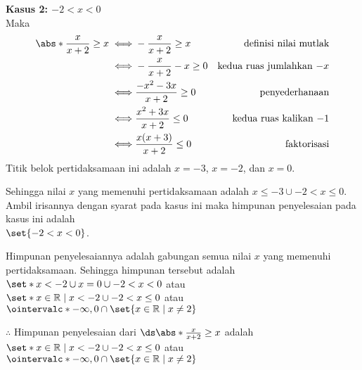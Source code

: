 \begin{enumerate}[leftmargin=*, label={\arabic*}.]
\begin{enumerate}[label={\alph*}.]
\textbf{Kasus 2: $-2 < x < 0$}\\
Maka
\begin{align*}
    \abs*{\frac{x}{x+2}} \geq x
    \iff &-\frac{x}{x+2} \geq x
    &\text{definisi nilai mutlak} \\
    \iff &-\frac{x}{x+2} -x \geq 0
    &\text{kedua ruas jumlahkan $-x$}\\
    \iff &\frac{-x^{2}-3x}{x+2} \geq 0
    &\text{penyederhanaan}\\
    \iff &\frac{x^{2}+3x}{x+2} \leq 0
    &\text{kedua ruas kalikan $-1$}\\
    \iff &\frac{x(x+3)}{x+2} \leq 0
    &\text{faktorisasi}\\
\end{align*}
Titik belok pertidaksamaan ini adalah $x=-3$, $x=-2$, dan $x=0$.
\begin{center}
\end{center}
Sehingga nilai $x$ yang memenuhi pertidaksamaan adalah $x \leq -3 \cup -2 < x \leq 0$. Ambil 
irisannya dengan syarat pada kasus ini maka himpunan penyelesaian pada kasus ini adalah 
\\$\set{-2 < x < 0}$. 

Himpunan penyelesaiannya adalah gabungan semua nilai $x$ yang memenuhi pertidaksamaan. 
Sehingga himpunan tersebut adalah 
$\set*{x < -2 \cup x = 0 \cup -2 < x < 0}$ 
atau \\
$\set*{x \in \mathbb{R} \mid x < -2 \cup -2 < x \leq 0}$
atau
$\ointervalc*{-\infty,0} \cap \set{x \in \mathbb{R} \mid x \neq 2}$

$\therefore$ Himpunan penyelesaian dari 
$\ds \abs*{\frac{x}{x+2}} \geq x$ adalah 
$\set*{x \in \mathbb{R} \mid x < -2 \cup -2 < x \leq 0}$
atau \\
$\ointervalc*{-\infty,0} \cap \set{x \in \mathbb{R} \mid x \neq 2}$


\end{enumerate}
\end{enumerate}
